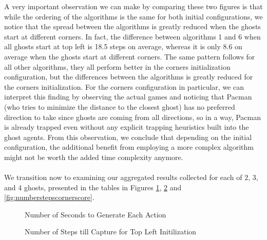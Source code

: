 \documentclass[11pt]{article}
\begin{document}
\begin{multicols}{2}
A very important observation we can make by comparing these two figures is that while the ordering of the algorithms is the same for both initial configurations, we notice that the spread between the algorithms is greatly reduced when the ghosts start at different corners. In fact, the difference between algorithms 1 and 6 when all ghosts start at top left is 18.5 steps on average, whereas it is only 8.6 on average when the ghosts start at different corners. The same pattern follows for all other algorithms, they all perform better in the corners initialization configuration, but the differences between the algorithms is greatly reduced for the corners initialization. For the corners configuration in particular, we can interpret this finding by observing the actual games and noticing that Pacman (who tries to minimize the distance to the closest ghost) has no preferred direction to take since ghosts are coming from all directions, so in a way, Pacman is already trapped even without any explicit trapping heuristics built into the ghost agents. From this observation, we conclude that depending on the initial configuration, the additional benefit from employing a more complex algorithm might not be worth the added time complexity anymore.\\\\

We transition now to examining our aggregated results collected for each of 2, 3, and 4 ghosts, presented in the tables in Figures \ref{fig:numsecondsaction}, \ref{fig:numsecondinitialization} and \ref{fig:numberstepscornerscore}. 

\end{multicols}

\begin{figure}[H]
	\caption{Number of Seconds to Generate Each Action}
	\label{fig:numsecondsaction}
\end{figure}

\begin{figure}[H]
	\caption{Number of Steps till Capture for Top Left Initilization}
	\label{fig:numsecondinitialization}
\end{figure}
\end{document}
